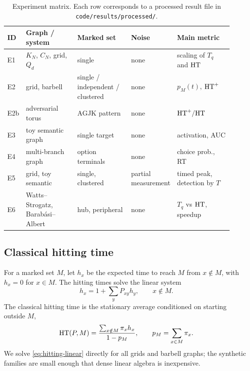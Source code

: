 \begin{table}[t]
  \centering
  \small
  \begin{tabular}{@{}>{\raggedright\arraybackslash}p{0.05\linewidth}
    >{\raggedright\arraybackslash}p{0.23\linewidth}
    >{\raggedright\arraybackslash}p{0.24\linewidth}
    >{\raggedright\arraybackslash}p{0.15\linewidth}
    >{\raggedright\arraybackslash}p{0.25\linewidth}@{}}
    \toprule
    ID & Graph / system & Marked set & Noise & Main metric \\
    \midrule
    E1 & $K_N$, $C_N$, grid, $Q_d$ & single & none & scaling of $T_q$ and $\mathrm{HT}$ \\
    E2 & grid, barbell & single / independent / clustered & none & $p_M(t)$, $\mathrm{HT}^+$ \\
    E2b & adversarial torus & AGJK pattern & none & $\mathrm{HT}^+/\mathrm{HT}$ \\
    E3 & toy semantic graph & single target & none & activation, AUC \\
    E4 & multi-branch graph & option terminals & none & choice prob., RT \\
    E5 & grid, toy semantic & single, clustered & partial measurement & timed peak, detection by $T$ \\
    E6 & Watts--Strogatz, Barab\'asi--Albert & hub, peripheral & none & $T_q$ vs $\mathrm{HT}$, speedup \\
    \bottomrule
  \end{tabular}
  \caption{Experiment matrix. Each row corresponds to a processed result file in
  \texttt{code/results/processed/}.}
  \label{tab:experiment-matrix}
\end{table}

\subsection{Classical hitting time}
\label{sec:methods-classical}

For a marked set $M$, let $h_x$ be the expected time to reach $M$ from
$x\notin M$, with $h_x=0$ for $x\in M$. The hitting times solve the linear
system
\begin{equation}
  h_x=1+\sum_{y}P_{xy}h_y,\qquad x\notin M.
  \label{eq:hitting-linear}
\end{equation}
The classical hitting time is the stationary average conditioned on starting
outside $M$,
\begin{equation}
  \mathrm{HT}(P,M)=\frac{\sum_{x\notin M}\pi_x h_x}{1-p_M},
  \qquad p_M=\sum_{x\in M}\pi_x.
  \label{eq:hitting}
\end{equation}
We solve \eqref{eq:hitting-linear} directly for all grids and barbell graphs;
the synthetic families are small enough that dense linear algebra is
inexpensive.

